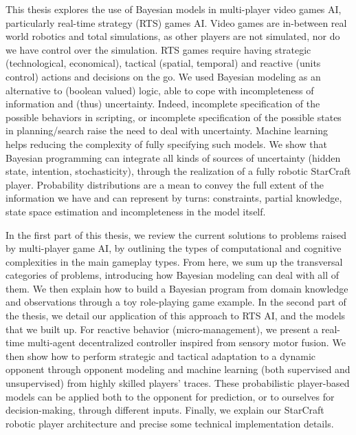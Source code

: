 This thesis explores the use of Bayesian models in multi-player video games AI, particularly real-time strategy (RTS) games AI. Video games are in-between real world robotics and total simulations, as other players are not simulated, nor do we have control over the simulation. RTS games require having strategic (technological, economical), tactical (spatial, temporal) and reactive (units control) actions and decisions on the go. %
We used Bayesian modeling as an alternative to (boolean valued) logic, able to cope with incompleteness of information and (thus) uncertainty. %
Indeed, incomplete specification of the possible behaviors in scripting, or incomplete specification of the possible states in planning/search raise the need to deal with uncertainty. Machine learning helps reducing the complexity of fully specifying such models. 
We show that Bayesian programming can integrate all kinds of sources of uncertainty (hidden state, intention, stochasticity), through the realization of a fully robotic StarCraft player. Probability distributions are a mean to convey the full extent of the information we have %
and can represent by turns: constraints, partial knowledge, state space estimation and incompleteness in the model itself.

In the first part of this thesis, we review the current solutions to problems raised by multi-player game AI, by outlining the types of computational and cognitive complexities in the main gameplay types. From here, we sum up the transversal categories of problems, introducing how Bayesian modeling can deal with all of them. We then explain how to build a Bayesian program from domain knowledge and observations through a toy role-playing game example. In the second part of the thesis, we detail our application of this approach to RTS AI, and the models that we built up. For reactive behavior (micro-management), we present a real-time multi-agent decentralized controller inspired from sensory motor fusion. We then show how to perform strategic and tactical adaptation to a dynamic opponent through opponent modeling and machine learning (both supervised and unsupervised) from highly skilled players' traces. These probabilistic player-based models can be applied both to the opponent for prediction, or to ourselves for decision-making, through different inputs. Finally, we explain our StarCraft robotic player architecture and precise some technical implementation details.

